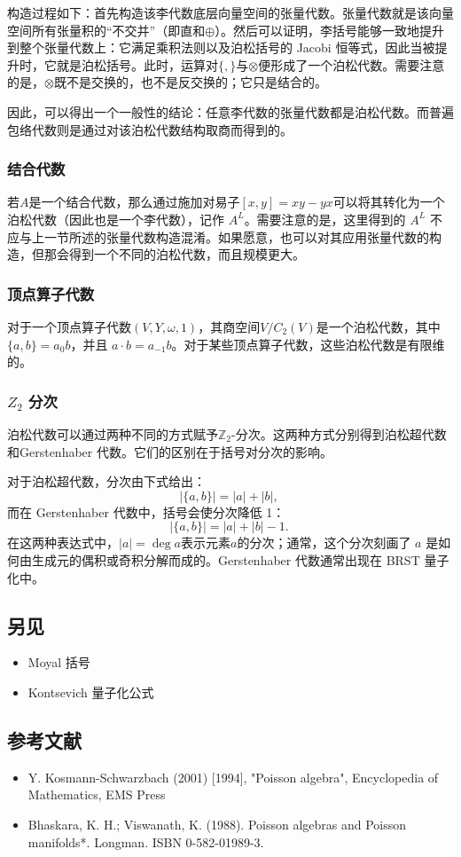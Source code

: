 构造过程如下：首先构造该李代数底层向量空间的张量代数。张量代数就是该向量空间所有张量积的“不交并”（即直和$\oplus$）。然后可以证明，李括号能够一致地提升到整个张量代数上：它满足乘积法则以及泊松括号的 Jacobi 恒等式，因此当被提升时，它就是泊松括号。此时，运算对$\{,\}$与$\otimes$便形成了一个泊松代数。需要注意的是，$\otimes$既不是交换的，也不是反交换的；它只是结合的。

因此，可以得出一个一般性的结论：任意李代数的张量代数都是泊松代数。而普遍包络代数则是通过对该泊松代数结构取商而得到的。
\subsubsection{结合代数}
若$A$是一个结合代数，那么通过施加对易子$[x,y] = xy - yx$可以将其转化为一个泊松代数（因此也是一个李代数），记作 $A^L$。需要注意的是，这里得到的 $A^L$ 不应与上一节所述的张量代数构造混淆。如果愿意，也可以对其应用张量代数的构造，但那会得到一个不同的泊松代数，而且规模更大。
\subsubsection{顶点算子代数}
对于一个顶点算子代数$(V, Y, \omega, 1)$，其商空间$V / C_2(V)$是一个泊松代数，其中$\{a, b\} = a_0 b$，并且 $a \cdot b = a_{-1} b$。对于某些顶点算子代数，这些泊松代数是有限维的。
\subsubsection{ \(Z_2\) 分次}
泊松代数可以通过两种不同的方式赋予$\mathbb{Z}_2$-分次。这两种方式分别得到泊松超代数和Gerstenhaber 代数。它们的区别在于括号对分次的影响。

对于泊松超代数，分次由下式给出：
$$
|\{a,b\}| = |a| + |b|,~
$$
而在 Gerstenhaber 代数中，括号会使分次降低 1：
$$
|\{a,b\}| = |a| + |b| - 1.~
$$
在这两种表达式中，$|a| = \deg a$表示元素$a$的分次；通常，这个分次刻画了 $a$ 是如何由生成元的偶积或奇积分解而成的。Gerstenhaber 代数通常出现在 BRST 量子化中。
\subsection{另见}
\begin{itemize}
\item Moyal 括号
\item Kontsevich 量子化公式
\end{itemize}
\subsection{参考文献}
\begin{itemize}
\item Y. Kosmann-Schwarzbach (2001) [1994], "Poisson algebra", Encyclopedia of Mathematics, EMS Press
\item Bhaskara, K. H.; Viswanath, K. (1988). Poisson algebras and Poisson manifolds*. Longman. ISBN 0-582-01989-3.
\end{itemize}